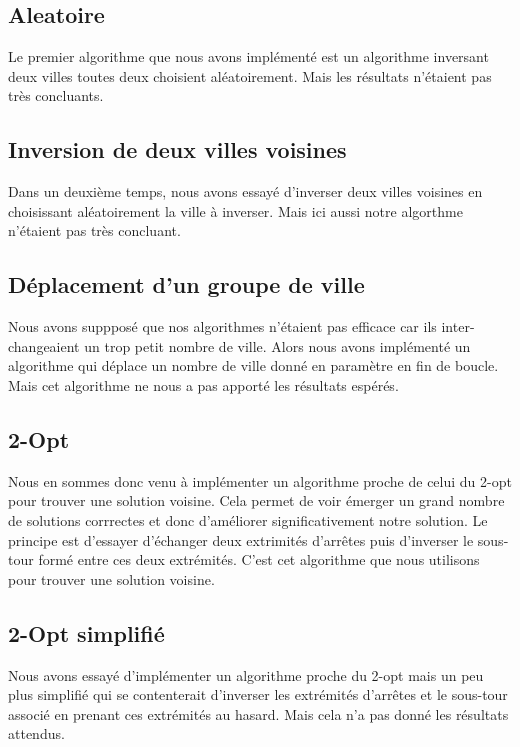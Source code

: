 \documentclass{article}
\begin{document}
\subsection{Aleatoire}

Le premier algorithme que nous avons implémenté est un algorithme inversant deux villes toutes deux choisient aléatoirement. Mais les résultats n'étaient pas très concluants.

\subsection{Inversion de deux villes voisines}

Dans un deuxième temps, nous avons essayé d'inverser deux villes voisines en choisissant aléatoirement la ville à inverser. Mais ici aussi notre algorthme n'étaient pas très concluant.

\subsection{Déplacement d'un groupe de ville}

Nous avons suppposé que nos algorithmes n'étaient pas efficace car ils inter-changeaient un trop petit nombre de ville. Alors nous avons implémenté un algorithme qui déplace un nombre de ville donné en paramètre en fin de boucle. Mais cet algorithme ne nous a pas apporté les résultats espérés.

\subsection{2-Opt}

Nous en sommes donc venu à implémenter un algorithme proche de celui du 2-opt pour trouver une solution voisine. Cela permet de voir émerger un grand nombre de solutions corrrectes et donc d'améliorer significativement notre solution. Le principe est d'essayer d'échanger deux extrimités d'arrêtes puis d'inverser le sous-tour formé entre ces deux extrémités. C'est cet algorithme que nous utilisons pour trouver une solution voisine.

\subsection{2-Opt simplifié}

Nous avons essayé d'implémenter un algorithme proche du 2-opt mais un peu plus simplifié qui se contenterait d'inverser les extrémités d'arrêtes et le sous-tour associé en prenant ces extrémités au hasard. Mais cela n'a pas donné les résultats attendus.
\end{document}
